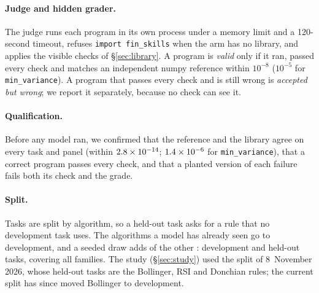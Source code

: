 \paragraph{Judge and hidden grader.}
The judge runs each program in its own process under a memory limit and a 120-second timeout,
refuses \texttt{import fin\_skills} when the arm has no library, and applies the visible checks
of \S\ref{sec:library}. A program is \emph{valid} only if it ran, passed every check and matches
an independent numpy reference within $10^{-8}$ ($10^{-5}$ for \texttt{min\_variance}). A
program that passes every check and is still wrong is \emph{accepted but wrong}; we report it
separately, because no check can see it.

\paragraph{Qualification.}
Before any model ran, we confirmed that the reference and the library agree on every task and
panel (within $2.8\times10^{-14}$; $1.4\times10^{-6}$ for \texttt{min\_variance}), that a correct
program passes every check, and that a planted version of each failure fails both its check and
the grade.

\paragraph{Split.}
Tasks are split by algorithm, so a held-out task asks for a rule that no development task uses.
The \NForcedDev{} algorithms a model has already seen go to development, and a seeded draw adds
\NDrawnDev{} of the other \NDrawn{}: \NDevTasks{} development and \NHeldTasks{} held-out tasks,
covering all \NFamilies{} families. The study (\S\ref{sec:study}) used the split of 8~November
2026, whose \StudyHeldTasks{} held-out tasks are the Bollinger, RSI and Donchian rules; the
current split has since moved Bollinger to development.
